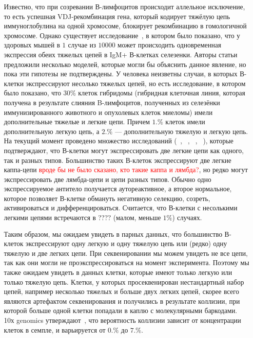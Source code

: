 \documentclass{spbau-diploma}
\newcommand{\todo}{\textcolor{red}}
\begin{document}
Известно, что при созревании В-лимфоцитов происходит аллельное исключение, то есть успешная VDJ-рекомбинация гена, который кодирует тяжёлую цепь иммуноглобулина на одной хромосоме, блокирует  рекомбинацию в гомологичной хромосоме.
Однако существует исследование~\cite{barreto2000frequency}, в котором было показано, что у здоровых мышей в $1$ случае из $10000$ может происходить одновременная экспрессия обеих тяжелых цепей в IgM+ В-клетках селезенки.
Авторы статьи предложили несколько моделей, которые могли бы объяснить данное явление, но пока эти гипотезы не подтверждены.
У человека неизветны случаи, в которых В-клетки экспрессируют несолько тяжелых цепей, но есть исследование, в котором было показано, что $30\%$ клеток гибридомы (гибридная клеточная линия, которая получена в результате слияния B-лимфоцитов, полученных из селезёнки иммунизированного животного и опухолевых клеток миеломы) имели дополнительные тяжелые и легкие цепи.
Причем  $1.
\%$ клеток имели дополнительную легкую цепь, а $2.
\%$ --- дополнительную тяжелую и легкую цепь.
На текущий момент проведено множество исследований (~\cite{pelanda2014dual}, ~\cite{casellas2007igkappa}, ~\cite{liu2005receptor}, ~\cite{fraser2015immunoglobulin}), которые подтверждают, что В-клетки могут экспрессировать две легкие цепи как одного, так и разных типов.
Большинство таких В-клеток экспрессируют две легкие каппа-цепи \todo{вроде бы не было сказано, кто такие каппа и лямбда?}, но редко могут экспрессировать две лямбда-цепи и цепи разных типов.
Обычно одно экспрессируемое антитело получается аутореактивное, а второе нормальное, которое позволяет В-клетке обмануть негативную селекцию, созреть, активироваться и дифференцироваться.
Считается, что В-клетки  с несолькими легкими цепями встречаются в ???? (малом, меньше $1\%$) случаях.


Таким образом, мы ожидаем увидеть в парных данных, что большинство В-клеток экспрессируют одну легкую и одну тяжелую цепь или (редко) одну тяжелую и две легких цепи.
При секвенировании мы можем увидеть не все цепи, так как они могли не проэкспрессироваться на момент эксперимента.
Поэтому мы также ожидаем увидеть в данных клетки, которые имеют только легкую или только тяжелую цепь.
Клетки, у которых просеквенирован нестандартный набор цепей, например несколько тяжелых и больше двух легких цепей, скорее всего являются артефактом секвенирования и получились в результате коллизии, при которой больше одной клетки попадали в каплю с молекулярными баркодами.
10х genomics утверждают~\cite{10x_manual}, что вероятность коллизии зависит от концентрации клеток в семпле, и варьируется от $0.
\%$ до $7.
\%$.
\end{document}
